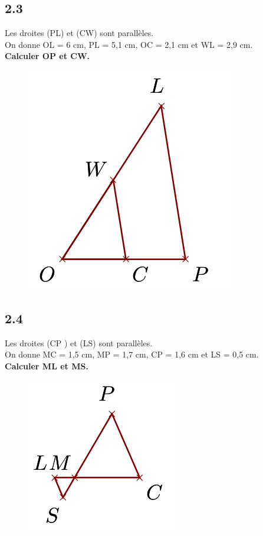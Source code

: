 \documentclass[12pt]{article}
\begin{document}
\begin{multicols}{2}
\subsection*{2.3}
\begin{multicols}{2}
Les droites (PL) et (CW) sont parallèles.\\
On donne OL = 6 cm, PL = 5,1 cm, OC = 2,1 cm et WL = 2,9 cm.\\
\textbf{Calculer OP et CW.}
\begin{figure}[H]
	\centering
	\includegraphics[width=.5\linewidth]{4x6-thales/sources/th3.png}
\end{figure}
\end{multicols}


\subsection*{2.4}
\begin{multicols}{2}
Les droites (CP ) et (LS) sont parallèles.\\
On donne MC = 1,5 cm, MP = 1,7 cm, CP = 1,6 cm et LS = 0,5 cm.\\
\textbf{Calculer ML et MS.}
\begin{figure}[H]
	\centering
	\includegraphics[width=.5\linewidth]{4x6-thales/sources/th4.png}
\end{figure}
\end{multicols}
\end{multicols}
\end{document}
